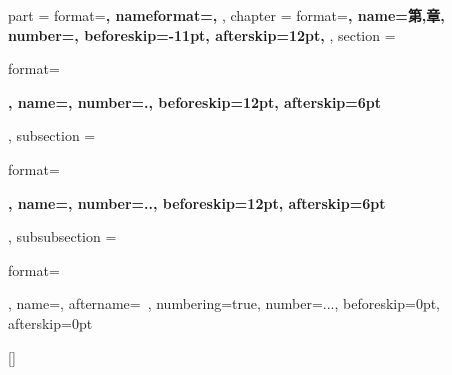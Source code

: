 \ctexset
{
    part =
    {
        format=\centering{}\bfseries,
        nameformat=\centering\heiti\fontsize{48}{48}\bfseries,
    },
    chapter = 
    {
        format=\centering{}\bfseries,
        name={第,章},
        number=,
        beforeskip=-11pt,
        afterskip=12pt,
    },
    section =
    {
        format=\raggedright{}\bfseries,
        name={},
        number=.,
        beforeskip=12pt,
        afterskip=6pt
    },
    subsection =
    {
        format=\raggedright{}\bfseries,
        name={},
        number=..,
        beforeskip=12pt,
        afterskip=6pt
    },
    subsubsection =
    {
        format=\raggedright{},
        name={},
        aftername=~,
        numbering=true,
        number=...,
        beforeskip=0pt,
        afterskip=0pt
    }
}

\makeatletter
{}
\makeatother


\renewcommand{\contentsname}{目录}
\newcommand{\markloc}{\addcontentsline{toc}{chapter}{目录}}
\renewcommand{\listfigurename}{图目录}
\newcommand{\marklof}{\addcontentsline{toc}{chapter}{图目录}}
\renewcommand{\listtablename}{表目录}
\newcommand{\marklot}{\addcontentsline{toc}{chapter}{表目录}}

[\bibname]{
}